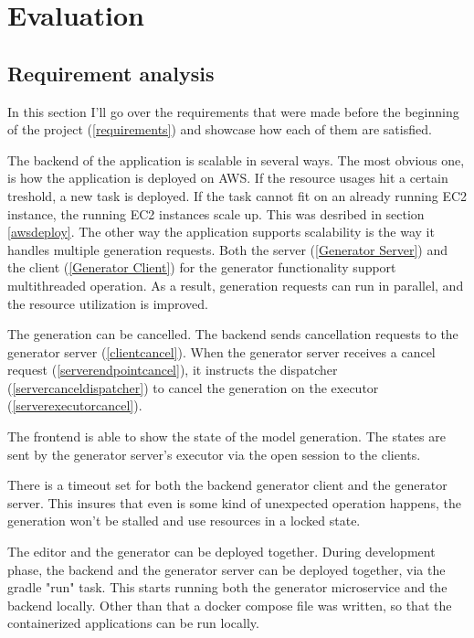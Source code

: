 \chapter{Evaluation}

	\section{Requirement analysis}
	In this section I'll go over the requirements that were made before the beginning of the project (\ref{requirements}) 
	and showcase how each of them are satisfied.

	The backend of the application is scalable in several ways. The most obvious one, is how the application is deployed on AWS. 
	If the resource usages hit a certain treshold, a new task is deployed. If the task cannot fit on an already running EC2 instance,
	the running EC2 instances scale up. This was desribed in section \ref{awsdeploy}. The other way the application supports 
	scalability is the way it handles multiple generation requests. Both the server (\ref{Generator Server}) and the client
	(\ref{Generator Client}) for the generator 
	functionality support multithreaded operation. As a result, generation requests can run in parallel, and the resource utilization
	is improved.

	The generation can be cancelled. The backend sends cancellation requests to the generator server (\ref{clientcancel}).
	When the generator server receives a cancel request (\ref{serverendpointcancel}), it instructs the dispatcher 
	(\ref{servercanceldispatcher}) to cancel the generation on the executor (\ref{serverexecutorcancel}).

	The frontend is able to show the state of the model generation. The states are sent by the generator server's executor via
	the open session to the clients.

	There is a timeout set for both the backend generator client and the generator server. This insures that even is some kind of 
	unexpected operation happens, the generation won't be stalled and use resources in a locked state.

	The editor and the generator can be deployed together. During development phase, the backend and the generator server can be 
	deployed together, via the gradle "run" task. This starts running both the generator microservice and the backend locally.
	Other than that a docker compose file was written, so that the containerized applications can be run locally.

